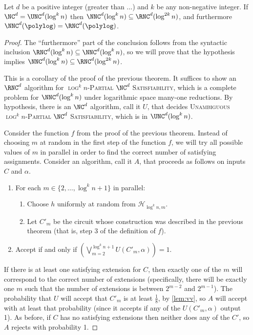 \documentclass{article}
\newcommand{\PSAT}{\textsc{$\log^k n$-Partial $\NC^d$ Satisfiability}}
\newcommand{\UPSAT}{\textsc{Unambiguous $\log^k n$-Partial $\NC^d$ Satisfiability}}
\begin{document}
\begin{corollary}
  Let $d$ be a positive integer (greater than ...) and $k$ be any non-negative integer.
  If $\NC^d = \UNC^d(\log^k n)$ then $\NNC^d(\log^k n) \subseteq \RNC^d(\log^{2k} n)$, and furthermore $\NNC^d(\polylog) = \RNC^d(\polylog)$.
\end{corollary}
\begin{proof}
  The ``furthermore'' part of the conclusion follows from the syntactic inclusion $\RNC^d(\log^k n) \subseteq \NNC^d(\log^k n)$, so we will prove that the hypothesis implies $\NNC^d(\log^k n) \subseteq \RNC^d(\log^{2k} n)$.

  This is a corollary of the proof of the previous theorem.
  It suffices to show an $\RNC^d$ algorithm for \PSAT, which is a complete problem for $\NNC^d(\log^k n)$ under logarithmic space many-one reductions.
  By hypothesis, there is an $\NC^d$ algorithm, call it $U$, that decides \UPSAT, which is in $\UNC^d(\log^k n)$.

  Consider the function $f$ from the proof of the previous theorem.
  Instead of choosing $m$ at random in the first step of the function $f$, we will try all possible values of $m$ in parallel in order to find the correct number of satisfying assignments.
  Consider an algorithm, call it $A$, that proceeds as follows on inputs $C$ and $\alpha$.
  \begin{enumerate}
  \item For each $m \in \{2, \dotsc, \log^k n + 1\}$ in parallel:
    \begin{enumerate}
    \item Choose $h$ uniformly at random from $\mathcal{H}_{\log^k n, m}$.
    \item Let $C'_m$ be the circuit whose construction was described in the previous theorem (that is, step 3 of the definition of $f$).
    \end{enumerate}
  \item Accept if and only if $\left(\bigvee_{m=2}^{\log^k n + 1} U(C'_m, \alpha)\right) = 1$.
  \end{enumerate}
  If there is at least one satisfying extension for $C$, then exactly one of the $m$ will correspond to the correct number of extensions (specifically, there will be exactly one $m$ such that the number of extensions is between $2^{m - 2}$ and $2^{m - 1}$).
  The probability that $U$ will accept that $C'_m$ is at least $\frac{1}{8}$, by \autoref{lem:vv}, so $A$ will accept with at least that probability (since it accepts if any of the $U(C'_m, \alpha)$ output 1).
  As before, if $C$ has no satisfying extensions then neither does any of the $C'$, so $A$ rejects with probability 1.


\end{proof}
\end{document}
